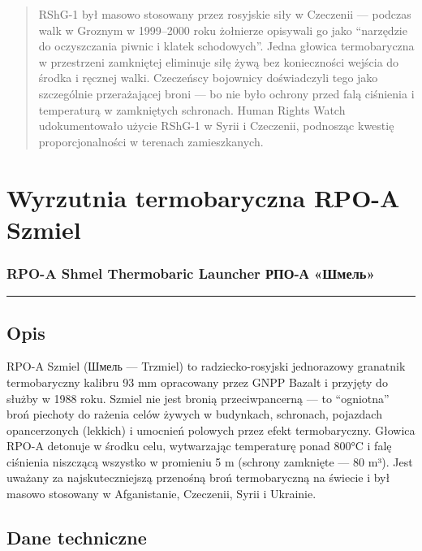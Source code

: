 \documentclass[12pt,openany,oneside]{book}
\begin{document}
\begin{quote}
RShG-1 był masowo stosowany przez rosyjskie siły w Czeczenii --- podczas
walk w Groznym w 1999--2000 roku żołnierze opisywali go jako ``narzędzie
do oczyszczania piwnic i klatek schodowych''. Jedna głowica
termobaryczna w przestrzeni zamkniętej eliminuje siłę żywą bez
konieczności wejścia do środka i ręcznej walki. Czeczeńscy bojownicy
doświadczyli tego jako szczególnie przerażającej broni --- bo nie było
ochrony przed falą ciśnienia i temperaturą w zamkniętych schronach.
Human Rights Watch udokumentowało użycie RShG-1 w Syrii i Czeczenii,
podnosząc kwestię proporcjonalności w terenach zamieszkanych.
\end{quote}

\chapter{Wyrzutnia termobaryczna RPO-A
Szmiel}\label{wyrzutnia-termobaryczna-rpo-a-szmiel}

\subsection{RPO-A Shmel Thermobaric Launcher \textbar{} РПО-А
«Шмель»}\label{rpo-a-shmel-thermobaric-launcher-ux440ux43fux43e-ux430-ux448ux43cux435ux43bux44c}

\begin{center}\rule{0.5\linewidth}{0.5pt}\end{center}

\section{Opis}\label{opis-77}

RPO-A Szmiel (Шмель --- Trzmiel) to radziecko-rosyjski jednorazowy
granatnik termobaryczny kalibru 93 mm opracowany przez GNPP Bazalt i
przyjęty do służby w 1988 roku. Szmiel nie jest bronią przeciwpancerną
--- to ``ogniotna'' broń piechoty do rażenia celów żywych w budynkach,
schronach, pojazdach opancerzonych (lekkich) i umocnień polowych przez
efekt termobaryczny. Głowica RPO-A detonuje w środku celu, wytwarzając
temperaturę ponad 800°C i falę ciśnienia niszczącą wszystko w promieniu
5 m (schrony zamknięte --- 80 m³). Jest uważany za najskuteczniejszą
przenośną broń termobaryczną na świecie i był masowo stosowany w
Afganistanie, Czeczenii, Syrii i Ukrainie.

\section{Dane techniczne}\label{dane-techniczne-77}
\end{document}
